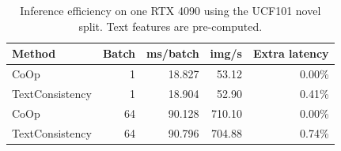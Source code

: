 \begin{table}[t]
\centering
\caption{Inference efficiency on one RTX 4090 using the UCF101 novel split. Text features are pre-computed.}
\label{tab:efficiency}
\small
\setlength{\tabcolsep}{4.5pt}
\begin{tabular}{lrrrr}
\toprule
Method & Batch & ms/batch & img/s & Extra latency \\
\midrule
CoOp & 1 & 18.827 & 53.12 & 0.00\% \\
TextConsistency & 1 & 18.904 & 52.90 & 0.41\% \\
CoOp & 64 & 90.128 & 710.10 & 0.00\% \\
TextConsistency & 64 & 90.796 & 704.88 & 0.74\% \\
\bottomrule
\end{tabular}
\end{table}
